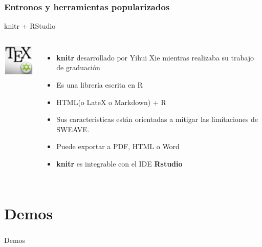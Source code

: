 \documentclass[sans serif,9pt,xcolor=dvipsnames]{beamer}%
\begin{document}
\begin{frame}
\frametitle {Entronos y herramientas popularizados}
\justifying
\begin{block}{knitr + RStudio}
\begin{columns}
 \hspace{0.7cm}
\includegraphics[width=1.8cm]{imagenes/texmaker.png} 
\begin{itemize}
\justifying
\item \textbf{knitr} desarrollado por Yihui Xie mientras realizaba su trabajo de graduación
\item Es una librería escrita en R
\item HTML(o LateX o Markdown) + R 
\item Sus caracteristicas están orientadas a mitigar las limitaciones de SWEAVE.
\item Puede exportar a PDF, HTML o Word
\item \textbf{knitr} es integrable con el IDE \textbf{Rstudio}
\end{itemize}
\end{columns}
\end{block}
\end{frame}


\section{Demos}
\begin{frame}
\frametitle {}
\centering \Huge Demos
\end{frame}

\end{document}
